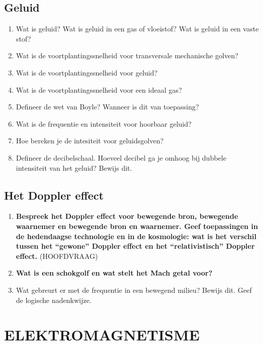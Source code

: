 \documentclass[a4paper,12pt]{article}
\begin{document}
    \subsection{Geluid}
    \begin{enumerate}
        \item Wat is geluid? Wat is geluid in een gas of vloeistof? Wat is geluid in een vaste stof?
        \item Wat is de voortplantingssnelheid voor transversale mechanische golven?
        \item Wat is de voortplantingssnelheid voor geluid?
        \item Wat is de voortplantingssnelheid voor een ideaal gas?
        \item Defineer de wet van Boyle? Wanneer is dit van toepassing?
        \item Wat is de frequentie en intensiteit voor hoorbaar geluid?
        \item Hoe bereken je de intesiteit voor geluidsgolven?
        \item Defineer de decibelschaal. Hoeveel decibel ga je omhoog bij dubbele intensiteit van het geluid? Bewijs dit.
    \end{enumerate}
    \subsection{Het Doppler effect}
    \begin{enumerate}
        \item \textbf{Bespreek het Doppler effect voor bewegende bron, bewegende waarnemer en bewegende bron en waarnemer. Geef toepassingen in de hedendaagse technologie en in de kosmologie: wat is het verschil tussen het “gewone” Doppler effect en het “relativistisch” Doppler effect.} (HOOFDVRAAG)
        \item \textbf{Wat is een schokgolf en wat stelt het Mach getal voor?}
        \item Wat gebreurt er met de frequentie in een bewegend milieu? Bewijs dit. Geef de logische nadenkwijze.
    \end{enumerate}
    

    \section{ELEKTROMAGNETISME}
\end{document}
